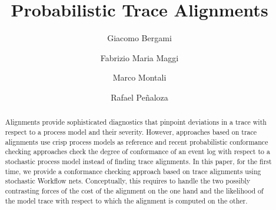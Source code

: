 \documentclass[runningheads]{llncs}
\begin{document}
%
\title{Probabilistic Trace Alignments}

\author{Giacomo Bergami \and
Fabrizio Maria Maggi \and
Marco Montali \and
Rafael Pe\~naloza}
%
%
%
\maketitle              %
%
\begin{abstract}
Alignments provide sophisticated diagnostics that pinpoint deviations in a trace with respect to a process model and their severity. However, approaches based on trace alignments use crisp process models as reference and recent probabilistic conformance checking approaches check the degree of conformance of an event log with respect to a stochastic process model instead of finding trace alignments. In this paper, for the first time, we provide a conformance checking approach based on trace alignments using stochastic Workflow nets. Conceptually, this requires to handle the two possibly contrasting forces of the cost of the alignment on the one hand and the likelihood of the model trace with respect to which the alignment is computed on the other.

\end{abstract}












\end{document}
